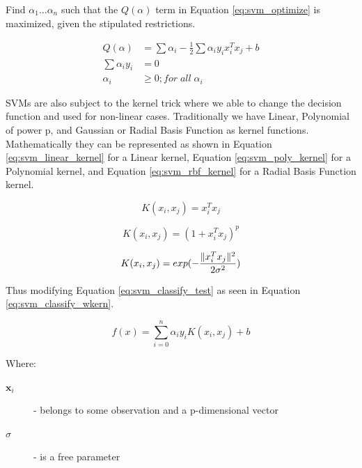 \documentclass[conference]{sig-alternate-05-2015}
\DeclarePairedDelimiter\norm{\lVert}{\rVert}%
\begin{document}
Find $\alpha_1 ... \alpha_n$ such that the $ Q(\alpha) $ term in Equation
\ref{eq:svm_optimize} is maximized, given the stipulated restrictions.

\begin{equation}
  \label{eq:svm_optimize}
  \begin{aligned}
    Q(\alpha) &= \sum \alpha_i - \frac{1}{2} \sum \alpha_i y_i x_i ^ T x_j + b \\
    \sum \alpha_i y_i &= 0 \\
    \alpha_i &\geq 0; for\; all\; \alpha_i
  \end{aligned}
\end{equation}

SVMs are also subject to the kernel trick where we able to change the decision
function and used for non-linear cases. Traditionally we have Linear, Polynomial
of power p, and Gaussian or Radial Basis Function as kernel functions.
Mathematically they can be represented as shown in Equation
\ref{eq:svm_linear_kernel} for a Linear kernel, Equation
\ref{eq:svm_poly_kernel} for a Polynomial kernel, and Equation
\ref{eq:svm_rbf_kernel} for a Radial Basis Function kernel.

\begin{equation}
  \label{eq:svm_linear_kernel}
  K(x_i,x_j) = x_i ^ T x_j
\end{equation}

\begin{equation}
  \label{eq:svm_poly_kernel}
  K(x_i,x_j) = (1+ x_i ^ T x_j )^p
\end{equation}

\begin{equation}
  \label{eq:svm_rbf_kernel}
  K(x_i,x_j) = exp(-\frac{\norm{x_i ^ T x_j }^2}{2\sigma^2})
\end{equation}

Thus modifying Equation \ref{eq:svm_classify_test} as seen in Equation
\ref{eq:svm_classify_wkern}.\par

\noindent\hrulefill
\begin{equation}
  \label{eq:svm_classify_wkern}
  f(x) = \sum_{i=0} ^n \alpha_i y_i K(x_i,x_j)+b
\end{equation}

\noindent Where:
\begin{description}
  \item[$\textbf{x}_i$] - belongs to some observation and a p-dimensional vector
  \item[$\sigma$] - is a free parameter
\end{description}
\noindent\hrulefill
\end{document}
